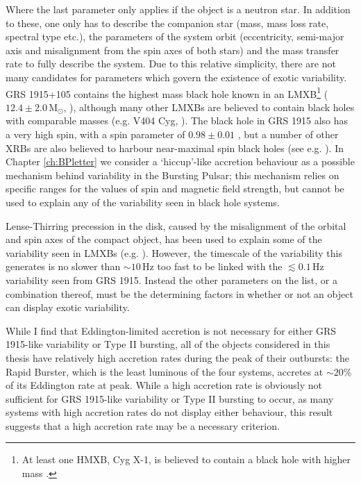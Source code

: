 Where the last parameter only applies if the object is a neutron star.  In addition to these, one only has to describe the companion star (mass, mass loss rate, spectral type etc.), the parameters of the system orbit (eccentricity, semi-major axis and misalignment from the spin axes of both stars) and the mass transfer rate to fully describe the system.  Due to this relative simplicity, there are not many candidates for parameters which govern the existence of exotic variability.  GRS 1915+105 contains the highest mass black hole known in an LMXB\footnote{At least one HMXB, Cyg X-1, is believed to contain a black hole with higher mass \citep{Orosz_CygX1}.} ($12.4\pm2.0$\,M$_\odot$, \citealp{Reid_Parallax}), although many other LMXBs are believed to contain black holes with comparable masses (e.g. V404 Cyg, \citealp{Shahbaz_V404}).  The black hole in GRS 1915 also has a very high spin, with a spin parameter of $0.98\pm0.01$ \citep{Miller_GRSspin}, but a number of other XRBs are also believed to harbour near-maximal spin black holes (see e.g. \citealp{Fragos_spin}).  In Chapter \ref{ch:BPletter} we consider a `hiccup'-like accretion behaviour as a possible mechanism behind variability in the Bursting Pulsar; this mechanism relies on specific ranges for the values of spin and magnetic field strength, but cannot be used to explain any of the variability seen in black hole systems.
\par Lense-Thirring precession in the disk, caused by the misalignment of the orbital and spin axes of the compact object, has been used to explain some of the variability seen in LMXBs (e.g. \citealp{Stella_LT}).  However, the timescale of the variability this generates is no slower than $\sim10$\,Hz \citep{Ingram_Solid} too fast to be linked with the $\lesssim0.1$\,Hz variability seen from GRS 1915.  Instead the other parameters on the list, or a combination thereof, must be the determining factors in whether or not an object can display exotic variability.
\par While I find that Eddington-limited accretion is not necessary for either GRS 1915-like variability or Type II bursting, all of the objects considered in this thesis have relatively high accretion rates during the peak of their outbursts: the Rapid Burster, which is the least luminous of the four systems, accretes at $\sim20$\% of its Eddington rate at peak.  While a high accretion rate is obviously not sufficient for GRS 1915-like variability or Type II bursting to occur, as many systems with high accretion rates do not display either behaviour, this result suggests that a high accretion rate may be a necessary criterion.

